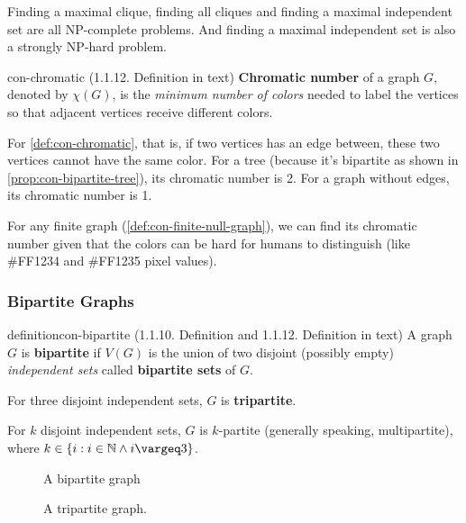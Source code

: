 \documentclass[../src/handouts/main.tex]{subfiles}
\begin{document}
Finding a maximal clique, finding all cliques and finding a maximal independent set are all NP-complete problems.
And finding a maximal independent set is also a strongly NP-hard problem.

\begin{definition}{}{con-chromatic}
  (1.1.12. Definition in text)
  \textbf{Chromatic number} of a graph $G$, denoted by $\chi (G)$, is the \textit{minimum number of colors} needed to label the vertices so that adjacent vertices receive different colors.
\end{definition}

For \cref{def:con-chromatic}, that is, if two vertices has an edge between, these two vertices cannot have the same color. For a tree (because it's bipartite as shown in \cref{prop:con-bipartite-tree}), its chromatic number is 2. For a graph without edges, its chromatic number is 1.

For any finite graph (\cref{def:con-finite-null-graph}), we can find its chromatic number given that the colors can be hard for humans to distinguish (like \#FF1234 and \#FF1235 pixel values).


\subsubsection{Bipartite Graphs}

\begin{recallable}{definition}{}{con-bipartite}
  (1.1.10. Definition and 1.1.12. Definition in text)
  A graph $G$ is \textbf{bipartite} if $V(G)$ is the union of two disjoint (possibly empty) \textit{independent sets} called \textbf{bipartite sets} of $G$.

  For three disjoint independent sets, $G$ is \textbf{tripartite}.

  For $k$ disjoint independent sets, $G$ is $k$-partite (generally speaking, multipartite), where $k \in \set{ i : i \in \N \land i \geq 3}$.
\end{recallable}

\begin{figure*}[ht]
  \centering
  \begin{subfigure}{.4\textwidth}
    \centering
    \bipartitegraphwithlabels
    \caption{A bipartite graph}
    \label{fig:con-bipartite}
  \end{subfigure}
  \hspace{.1\textwidth}
  \begin{subfigure}{.4\textwidth}
    \centering
    \tripartitegraph
    \caption{A tripartite graph.}
    \label{fig:con-tripartite}
  \end{subfigure}
  \caption{Bipartite and tripartite graphs.}
  \label{fig:con-bipartite-tripartite}
\end{figure*}
\end{document}
